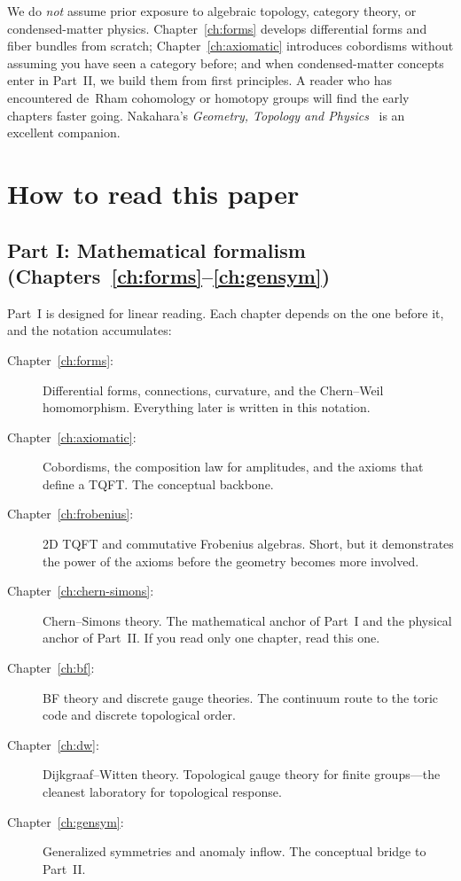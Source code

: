 We do \emph{not} assume prior exposure to algebraic topology, category theory, or condensed-matter physics.  Chapter~\ref{ch:forms} develops differential forms and fiber bundles from scratch; Chapter~\ref{ch:axiomatic} introduces cobordisms without assuming you have seen a category before; and when condensed-matter concepts enter in Part~II, we build them from first principles.  A reader who has encountered de~Rham cohomology or homotopy groups will find the early chapters faster going.  Nakahara's \emph{Geometry, Topology and Physics}~\cite{Nakahara2003GTP} is an excellent companion.


\section{How to read this paper}\label{sec:howto}

\subsection*{Part I: Mathematical formalism (Chapters~\ref{ch:forms}--\ref{ch:gensym})}

Part~I is designed for linear reading.  Each chapter depends on the one before it, and the notation accumulates:

\begin{description}
\item[Chapter~\ref{ch:forms}:]  Differential forms, connections, curvature, and the Chern--Weil homomorphism.  Everything later is written in this notation.

\item[Chapter~\ref{ch:axiomatic}:]  Cobordisms, the composition law for amplitudes, and the axioms that define a TQFT.  The conceptual backbone.

\item[Chapter~\ref{ch:frobenius}:]  2D TQFT and commutative Frobenius algebras.  Short, but it demonstrates the power of the axioms before the geometry becomes more involved.

\item[Chapter~\ref{ch:chern-simons}:]  Chern--Simons theory.  The mathematical anchor of Part~I and the physical anchor of Part~II.  If you read only one chapter, read this one.

\item[Chapter~\ref{ch:bf}:]  BF theory and discrete gauge theories.  The continuum route to the toric code and discrete topological order.

\item[Chapter~\ref{ch:dw}:]  Dijkgraaf--Witten theory.  Topological gauge theory for finite groups---the cleanest laboratory for topological response.

\item[Chapter~\ref{ch:gensym}:]  Generalized symmetries and anomaly inflow.  The conceptual bridge to Part~II.
\end{description}

